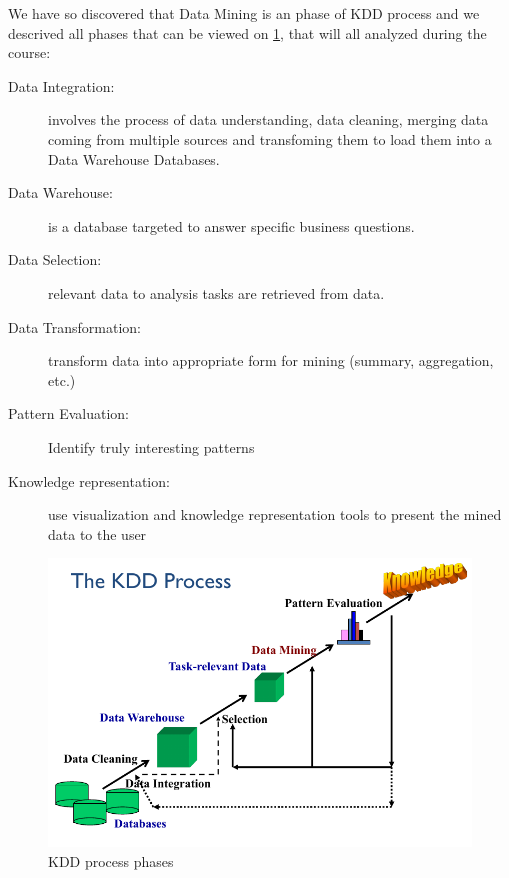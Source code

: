 We have so discovered that Data Mining is an phase of KDD process and we descrived all phases that can be 
viewed on \ref{img:kddProcess}, that will all analyzed during the course:
\begin{description}
    \item [Data Integration: ] involves the process of data understanding, data cleaning, merging data coming 
                               from multiple sources and transfoming them to load them
                               into a Data Warehouse Databases.
    \item [Data Warehouse: ]   is a database targeted to answer specific business questions.
    \item [Data Selection: ]   relevant data to analysis tasks are retrieved from data.
    \item [Data Transformation: ] transform data into appropriate form for mining (summary, aggregation, etc.)
    \item [Pattern Evaluation: ] Identify truly interesting patterns
    \item [Knowledge representation:] use visualization and knowledge representation tools to present
                                      the mined data to the user
\end{description}

\begin{figure}
    \caption{KDD process phases}
    \label{img:kddProcess}
    \includegraphics[width=\textwidth]{Images/kddProcess}
\end{figure}

